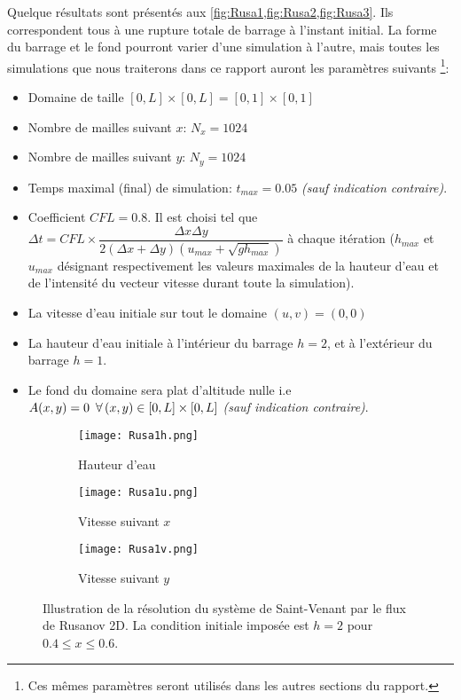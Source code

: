 \documentclass[
	french,
	11pt, %
]{fphw}
\newcommand{\hquad}{\hspace{0.5em}} %
\begin{document}
\noindent Quelque résultats sont présentés aux \cref{fig:Rusa1,fig:Rusa2,fig:Rusa3}. Ils correspondent tous à une rupture totale de barrage à l'instant initial. La forme du barrage et le fond pourront varier d'une simulation à l'autre, mais toutes les simulations que nous traiterons dans ce rapport auront les paramètres suivants \footnote{Ces mêmes paramètres seront utilisés dans les autres sections du rapport.}: 
\begin{itemize}
	\item Domaine de taille $[0,L]\times[0,L] = [0,1]\times[0,1]$
	\item Nombre de mailles suivant $x$: $N_x = 1024$
	\item Nombre de mailles suivant $y$: $N_y = 1024$
	\item Temps maximal (final) de simulation: $t_{max} = 0.05$ \textit{(sauf indication contraire)}.
	\item Coefficient $CFL = 0.8$. Il est choisi tel que $\Delta t = CFL \times \dfrac{\Delta x \Delta y}{2(\Delta x + \Delta y)\left( u_{max} + \sqrt{gh_{max}} \right)}$ à chaque itération ($h_{max}$ et $u_{max}$ désignant respectivement les valeurs maximales de la hauteur d'eau et de l'intensité du vecteur vitesse durant toute la simulation).
	\item La vitesse d'eau initiale sur tout le domaine $(u,v) = (0,0)$
	\item La hauteur d'eau initiale à l'intérieur du barrage $h=2$, et à l'extérieur du barrage $h=1$. 
	\item Le fond du domaine sera plat d'altitude nulle i.e $A(x,y)=0 \hquad \forall \, (x,y)\in[0,L]\times[0,L]$ \textit{(sauf indication contraire)}.
\end{itemize} 

\begin{figure}[H]
	\centering
	\begin{subfigure}{0.32\textwidth}
		\centering
		\texttt{[image: Rusa1h.png]}
		\caption{Hauteur d'eau}
		\label{fig:Rusa1h}
	\end{subfigure}
	\begin{subfigure}{0.32\textwidth}
		\centering
		\texttt{[image: Rusa1u.png]}
		\caption{Vitesse suivant $x$}
		\label{fig:Rusa1u}
	\end{subfigure}
	\begin{subfigure}{0.32\textwidth}
		\centering
		\texttt{[image: Rusa1v.png]}
		\caption{Vitesse suivant $y$}
		\label{fig:Rusa1v}
	\end{subfigure}
	\caption{Illustration de la résolution du système de Saint-Venant par le flux de Rusanov 2D. La condition initiale imposée est  $ h = 2$ pour $ 0.4 \leq x \leq 0.6$.}
	\label{fig:Rusa1}
\end{figure}
\end{document}
